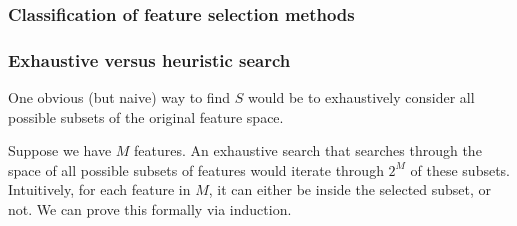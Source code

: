 \documentclass[12pt, twoside, a4paper]{article}
\begin{document}
\subsubsection{Classification of feature selection methods}

\subsubsection{Exhaustive versus heuristic search}

One obvious (but naive) way to find $S$ would be to exhaustively consider all possible subsets of the original feature space.

Suppose we have $M$ features. An exhaustive search that searches through the space of all possible subsets of features would iterate through $2^M$ of these subsets. Intuitively, for each feature in $M$, it can either be inside the selected subset, or not. We can prove this formally via induction.
\end{document}

